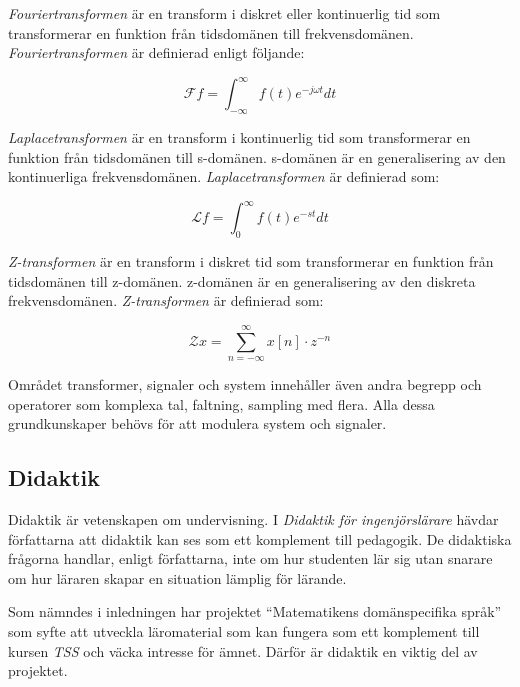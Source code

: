 \documentclass[]{article}
\begin{document}
\textit{Fouriertransformen} är en transform i diskret eller kontinuerlig tid som
transformerar en funktion från tidsdomänen till frekvensdomänen.
\textit{Fouriertransformen} är definierad enligt följande:

\[\mathcal{F} f = \int_{-\infty}^{\infty} f(t) e^{-j \omega t} dt\]

\textit{Laplacetransformen} är en transform i kontinuerlig tid som
transformerar en funktion från tidsdomänen till s-domänen. s-domänen är en
generalisering av den kontinuerliga frekvensdomänen. \textit{Laplacetransformen}
är definierad som:

\[ \mathcal{L} f = \int_{0}^{\infty} f(t)e^{-st} dt \]

\textit{Z-transformen} är en transform i diskret tid som transformerar en
funktion från tidsdomänen till z-domänen. z-domänen är en generalisering av
den diskreta frekvensdomänen. \textit{Z-transformen} är definierad som:

\[\mathcal{Z} x = \sum_{n=-\infty}^{\infty} x[n] \cdot z^{-n}\]

Området transformer, signaler och system innehåller även andra begrepp och
operatorer som komplexa tal, faltning, sampling med flera. Alla dessa
grundkunskaper behövs för att modulera system och signaler.

\subsection{Didaktik}
Didaktik är vetenskapen om undervisning.
I \textit{Didaktik för ingenjörslärare} hävdar författarna att
didaktik kan ses som ett komplement till pedagogik.
De didaktiska frågorna handlar, enligt författarna,
inte om hur studenten lär sig utan snarare om hur läraren skapar en
situation lämplig för lärande.

Som nämndes i inledningen har projektet “Matematikens domänspecifika språk”
som syfte att utveckla läromaterial som kan fungera som ett komplement till
kursen \textit{TSS} och väcka intresse för ämnet.
Därför är didaktik en viktig del av projektet.
\end{document}
